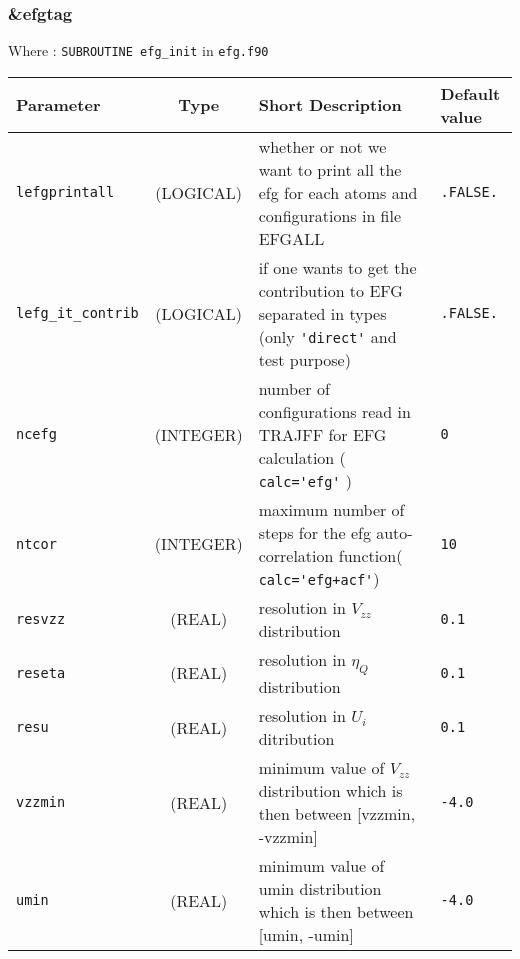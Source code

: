 \documentclass[a4paper,8pt]{article}
\begin{document}
\subsubsection{\&efgtag}

Where : \verb?SUBROUTINE efg_init? in \verb?efg.f90?
\newline

\begin{longtable}{l|c|m{8cm}|m{2cm}}
\hline
\hline
Parameter        &  Type              &          Short Description                                                          & Default value \\
\hline
\hline
\rule[-0.75cm]{0cm}{1.5cm}
\verb?lefgprintall?    
                 & (LOGICAL)          &  whether or not we want to print all the efg for each atoms and 
                                               configurations in file EFGALL                                                & \verb?.FALSE.? \\
\hline
\rule[-0.75cm]{0cm}{1.5cm}
\verb?lefg_it_contrib? 
                 & (LOGICAL)          & if one wants to get the contribution to EFG separated in types 
                                              (only \verb?'direct'? and test purpose)                                       & \verb?.FALSE.? \\
\hline
\rule[-0.75cm]{0cm}{1.5cm}
\verb?ncefg?     & (INTEGER)          & number of configurations read in TRAJFF for EFG calculation ( \verb?calc='efg'? )   & \verb?0? \\
\hline
\rule[-0.75cm]{0cm}{1.5cm}
\verb?ntcor?     & (INTEGER)          & maximum number of steps for the efg auto-correlation function( \verb?calc='efg+acf'?)
                                                                                                                            & \verb?10? \\
\hline
\rule[-0.75cm]{0cm}{1.5cm}
\verb?resvzz?    & (REAL)             & resolution in $V_{zz}$ distribution                                                 & \verb?0.1? \\
\hline
\rule[-0.75cm]{0cm}{1.5cm}
\verb?reseta?    & (REAL)             & resolution in $\eta_Q$ distribution                                                 & \verb?0.1? \\
\hline
\rule[-0.75cm]{0cm}{1.5cm}
\verb?resu?      & (REAL)             & resolution in $U_i$ ditribution                                                     & \verb?0.1? \\
\hline
\rule[-0.75cm]{0cm}{1.5cm}
\verb?vzzmin?    & (REAL)             & minimum value of $V_{zz}$ distribution which is then between [vzzmin, -vzzmin]      & \verb?-4.0? \\ 
\hline
\rule[-0.75cm]{0cm}{1.5cm}
\verb?umin?      & (REAL)             & minimum value of umin distribution which is then between [umin, -umin]              & \verb?-4.0? \\
\hline
\hline
\end{longtable}
\end{document}
